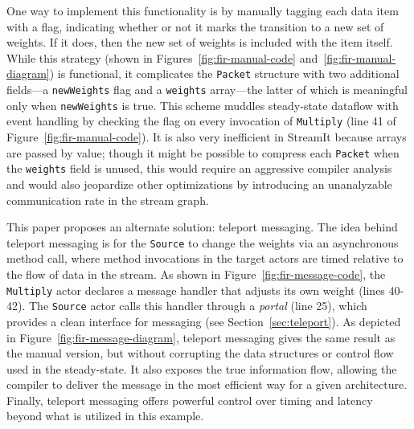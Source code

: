 \documentclass{sig-alternate}
\begin{document}
One way to implement this functionality is by manually tagging each
data item with a flag, indicating whether or not it marks the
transition to a new set of weights.  If it does, then the new set of
weights is included with the item itself.  While this strategy (shown
in Figures~\ref{fig:fir-manual-code} and~\ref{fig:fir-manual-diagram})
is functional, it complicates the {\tt Packet} structure with two
additional fields---a {\tt newWeights} flag and a {\tt weights}
array---the latter of which is meaningful only when {\tt newWeights}
is true.  This scheme muddles steady-state dataflow with event
handling by checking the flag on every invocation of {\tt Multiply}
(line 41 of Figure~\ref{fig:fir-manual-code}).  It is also very
inefficient in StreamIt because arrays are passed by value; though it
might be possible to compress each {\tt Packet} when the {\tt weights}
field is unused, this would require an aggressive compiler analysis
and would also jeopardize other optimizations by introducing an
unanalyzable communication rate in the stream graph.

This paper proposes an alternate solution: teleport messaging.  The
idea behind teleport messaging is for the {\tt Source} to change the
weights via an asynchronous method call, where method invocations in
the target actors are timed relative to the flow of data in the
stream.  As shown in Figure~\ref{fig:fir-message-code}, the {\tt
Multiply} actor declares a message handler that adjusts its own weight
(lines 40-42).  The {\tt Source} actor calls this handler through a
{\it portal} (line 25), which provides a clean interface for messaging
(see Section~\ref{sec:teleport}).  As depicted in
Figure~\ref{fig:fir-message-diagram}, teleport messaging gives the
same result as the manual version, but without corrupting the data
structures or control flow used in the steady-state.  It also exposes
the true information flow, allowing the compiler to deliver the
message in the most efficient way for a given architecture.  Finally,
teleport messaging offers powerful control over timing and latency
beyond what is utilized in this example.

\end{document}
